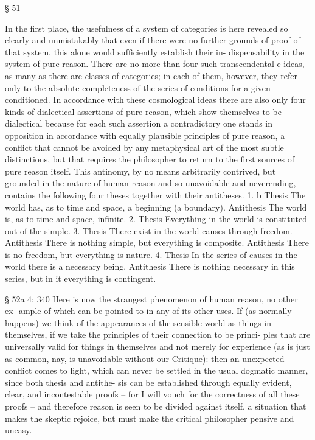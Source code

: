 § 51

In the ﬁrst place, the usefulness of a system of categories is here revealed
so clearly and unmistakably that even if there were no further grounds
of proof of that system, this alone would sufﬁciently establish their in-
dispensability in the system of pure reason. There are no more than four
such transcendental e ideas, as many as there are classes of categories; in
each of them, however, they refer only to the absolute completeness of
the series of conditions for a given conditioned. In accordance with these
cosmological ideas there are also only four kinds of dialectical assertions
of pure reason, which show themselves to be dialectical because for each
such assertion a contradictory one stands in opposition in accordance
with equally plausible principles of pure reason, a conﬂict that cannot
be avoided by any metaphysical art of the most subtle distinctions, but
that requires the philosopher to return to the ﬁrst sources of pure reason
itself. This antinomy, by no means arbitrarily contrived, but grounded
in the nature of human reason and so unavoidable and neverending,
contains the following four theses together with their antitheses.
1. b
Thesis
The world has, as to time and space,
a beginning (a boundary).
Antithesis
The world is, as to time and space,
inﬁnite.
2.
Thesis
Everything in the world
is constituted out of the
simple. 3.
Thesis
There exist in the world
causes through
freedom.
Antithesis
There is nothing simple,
but everything is
composite. Antithesis
There is no freedom,
but everything is
nature.
4.
Thesis
In the series of causes in the world there is a
necessary being.
Antithesis
There is nothing necessary in this series, but in it
everything is contingent.

§ 52a
4: 340
Here is now the strangest phenomenon of human reason, no other ex-
ample of which can be pointed to in any of its other uses. If (as normally
happens) we think of the appearances of the sensible world as things in
themselves, if we take the principles of their connection to be princi-
ples that are universally valid for things in themselves and not merely
for experience (as is just as common, nay, is unavoidable without our
Critique): then an unexpected conﬂict comes to light, which can never
be settled in the usual dogmatic manner, since both thesis and antithe-
sis can be established through equally evident, clear, and incontestable
proofs – for I will vouch for the correctness of all these proofs – and
therefore reason is seen to be divided against itself, a situation that makes
the skeptic rejoice, but must make the critical philosopher pensive and
uneasy.


